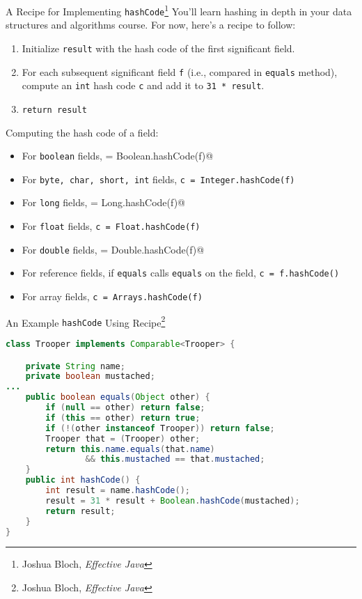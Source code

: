 \documentclass{beamer}
\begin{document}
\begin{frame}[fragile]{A Recipe for Implementing {\tt hashCode}\footnote{Joshua Bloch, {\it Effective Java}}}
\vspace{-.05in}
You'll learn hashing in depth in your data structures and algorithms course.  For now, here's a recipe to follow:

\begin{enumerate}
\item Initialize {\tt result} with the hash code of the first significant field.
\item For each subsequent significant field {\tt f} (i.e., compared in {\tt equals} method), compute an {\tt int} hash code {\tt c} and add it to {\tt 31 * result}.
\item {\tt return result}
\end{enumerate}
Computing the hash code of a field:
\begin{itemize}
\item For {\tt boolean} fields, \verb@c = Boolean.hashCode(f)@
\item For {\tt byte, char, short, int} fields, {\tt c = Integer.hashCode(f)}
\item For {\tt long} fields, \verb@c = Long.hashCode(f)@
\item For {\tt float} fields, {\tt c = Float.hashCode(f)}
\item For {\tt double} fields, \verb@c = Double.hashCode(f)@
\item For reference fields, if {\tt equals} calls {\tt equals} on the field, {\tt c = f.hashCode()}
\item For array fields, {\tt c = Arrays.hashCode(f)}
\end{itemize}

\end{frame}

\begin{frame}[fragile]{An Example {\tt hashCode} Using Recipe\footnote{Joshua Bloch, {\it Effective Java}}}

\begin{lstlisting}[language=Java]
class Trooper implements Comparable<Trooper> {

    private String name;
    private boolean mustached;
...
    public boolean equals(Object other) {
        if (null == other) return false;
        if (this == other) return true;
        if (!(other instanceof Trooper)) return false;
        Trooper that = (Trooper) other;
        return this.name.equals(that.name)
                && this.mustached == that.mustached;
    }
    public int hashCode() {
        int result = name.hashCode();
        result = 31 * result + Boolean.hashCode(mustached);
        return result;
    }
}
\end{lstlisting}

\end{frame}
\end{document}
